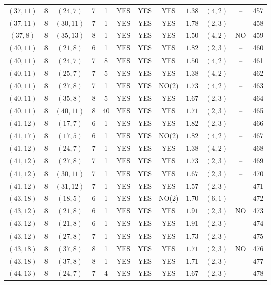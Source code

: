 \begin{longtable}{|c|c|c|c|c|c|c|c|c|c|c|c|}
$(37,11)$ & 8 & $(24,7)$ & 7 & 1 & YES & YES & YES & $1.38$ & $(4,2)$ & -- & 457\\
$(37,11)$ & 8 & $(30,11)$ & 7 & 1 & YES & YES & YES & $1.78$ & $(2,3)$ & -- & 458\\
$(37,8)$ & 8 & $(35,13)$ & 8 & 1 & YES & YES & YES & $1.50$ & $(4,2)$ & NO & 459\\
$(40,11)$ & 8 & $(21,8)$ & 6 & 1 & YES & YES & YES & $1.82$ & $(2,3)$ & -- & 460\\
$(40,11)$ & 8 & $(24,7)$ & 7 & 8 & YES & YES & YES & $1.50$ & $(4,2)$ & -- & 461\\
$(40,11)$ & 8 & $(25,7)$ & 7 & 5 & YES & YES & YES & $1.38$ & $(4,2)$ & -- & 462\\
$(40,11)$ & 8 & $(27,8)$ & 7 & 1 & YES & YES & NO(2) & $1.73$ & $(4,2)$ & -- & 463\\
$(40,11)$ & 8 & $(35,8)$ & 8 & 5 & YES & YES & YES & $1.67$ & $(2,3)$ & -- & 464\\
$(40,11)$ & 8 & $(40,11)$ & 8 & 40 & YES & YES & YES & $1.71$ & $(2,3)$ & -- & 465\\
$(41,12)$ & 8 & $(17,7)$ & 6 & 1 & YES & YES & YES & $1.82$ & $(2,3)$ & -- & 466\\
$(41,17)$ & 8 & $(17,5)$ & 6 & 1 & YES & YES & NO(2) & $1.82$ & $(4,2)$ & -- & 467\\
$(41,12)$ & 8 & $(24,7)$ & 7 & 1 & YES & YES & YES & $1.38$ & $(4,2)$ & -- & 468\\
$(41,12)$ & 8 & $(27,8)$ & 7 & 1 & YES & YES & YES & $1.73$ & $(2,3)$ & -- & 469\\
$(41,12)$ & 8 & $(30,11)$ & 7 & 1 & YES & YES & YES & $1.67$ & $(2,3)$ & -- & 470\\
$(41,12)$ & 8 & $(31,12)$ & 7 & 1 & YES & YES & YES & $1.57$ & $(2,3)$ & -- & 471\\
$(43,18)$ & 8 & $(18,5)$ & 6 & 1 & YES & YES & NO(2) & $1.70$ & $(6,1)$ & -- & 472\\
$(43,12)$ & 8 & $(21,8)$ & 6 & 1 & YES & YES & YES & $1.91$ & $(2,3)$ & NO & 473\\
$(43,12)$ & 8 & $(21,8)$ & 6 & 1 & YES & YES & YES & $1.91$ & $(2,3)$ & -- & 474\\
$(43,12)$ & 8 & $(27,8)$ & 7 & 1 & YES & YES & YES & $1.73$ & $(2,3)$ & -- & 475\\
$(43,18)$ & 8 & $(37,8)$ & 8 & 1 & YES & YES & YES & $1.71$ & $(2,3)$ & NO & 476\\
$(43,18)$ & 8 & $(37,8)$ & 8 & 1 & YES & YES & YES & $1.71$ & $(2,3)$ & -- & 477\\
$(44,13)$ & 8 & $(24,7)$ & 7 & 4 & YES & YES & YES & $1.67$ & $(2,3)$ & -- & 478\\

\end{longtable}
